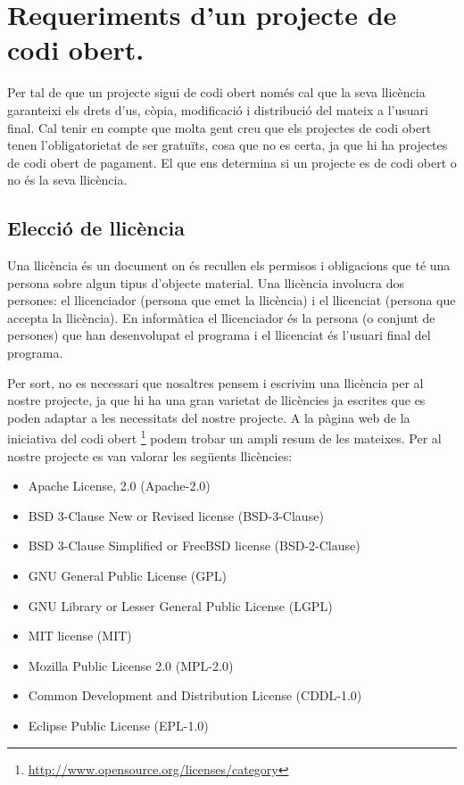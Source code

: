 \section{Requeriments d'un projecte de codi obert.}

Per tal de que un projecte sigui de codi obert només cal que la seva llicència garanteixi els drets  d'us, còpia,  modificació i distribució del mateix a l'usuari final. Cal tenir en compte que molta gent creu que els projectes de codi obert tenen l'obligatorietat de ser gratuïts, cosa que no es certa, ja que hi ha projectes de codi obert de pagament. El que ens determina si un projecte es de codi obert o no és la seva llicència. 

\subsection{Elecció de llicència}

Una llicència és un document on és recullen els permisos i obligacions que té una persona sobre algun tipus d'objecte material. Una llicència involucra dos persones: el llicenciador (persona que emet la llicència) i el llicenciat (persona que accepta la llicència). En informàtica el llicenciador és la persona (o conjunt de persones) que han desenvolupat el programa i el llicenciat és l'usuari final del programa. 

Per sort, no es necessari que nosaltres pensem i escrivim una llicència per al nostre projecte, ja que hi ha una gran varietat de llicències ja escrites que es poden adaptar a les necessitats del nostre projecte. A la pàgina web de la iniciativa del codi obert \footnote{\url{http://www.opensource.org/licenses/category}} podem trobar un ampli resum de les mateixes. Per al nostre projecte es van valorar les següents llicències: 

\begin{itemize}
\item{Apache License, 2.0 (Apache-2.0)}
\item{BSD 3-Clause New or Revised license (BSD-3-Clause)}
\item{BSD 3-Clause Simplified or FreeBSD license (BSD-2-Clause)}
\item{GNU General Public License (GPL)}
\item{GNU Library or Lesser General Public License (LGPL)}
\item{MIT license (MIT)}
\item{Mozilla Public License 2.0 (MPL-2.0)}
\item{Common Development and Distribution License (CDDL-1.0)}
\item{Eclipse Public License (EPL-1.0)}
\end{itemize}

